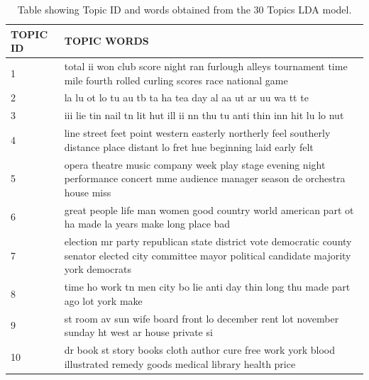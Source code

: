 \documentclass[10pt,journal,compsoc]{IEEEtran}
\begin{document}
\begin{table}
\caption{Table showing Topic ID and words obtained from the 30 Topics LDA model.}
\label{table:topicwords}
\resizebox{16cm}{!} {
 
   \begin{tabular}{|p{1cm}|p{16cm}|}

    \hline
    TOPIC ID & TOPIC WORDS                                                                                                                                           \\ \hline
    1        & total ii won club score night ran furlough alleys tournament time   mile fourth rolled curling scores race national game                              \\ \hline
    2        & la lu ot lo tu au tb ta ha tea day al aa ut ar uu wa tt te                                                                                            \\ \hline
    3        & iii lie tin nail tn lit hut ill ii nn thu tu anti thin inn hit lu lo   nut                                                                            \\ \hline
    4        & line street feet point western easterly northerly feel southerly   distance place distant lo fret hue beginning laid early felt                       \\ \hline
    5        & opera theatre music company week play stage evening night performance   concert mme audience manager season de orchestra house miss                   \\ \hline
    6        & great people life man women good country world american part ot ha   made la years make long place bad                                                \\ \hline
    7        & election mr party republican state district vote democratic county senator   elected city committee mayor political candidate majority york democrats \\ \hline
    8        & time ho work tn men city bo lie anti day thin long thu made part ago   lot york make                                                                  \\ \hline
    9        & st room av sun wife board front lo december rent lot november sunday   ht west ar house private si                                                    \\ \hline
    10       & dr book st story books cloth author cure free work york blood   illustrated remedy goods medical library health price                                 \\ \hline

\end{tabular}}
\end{table}
\end{document}
